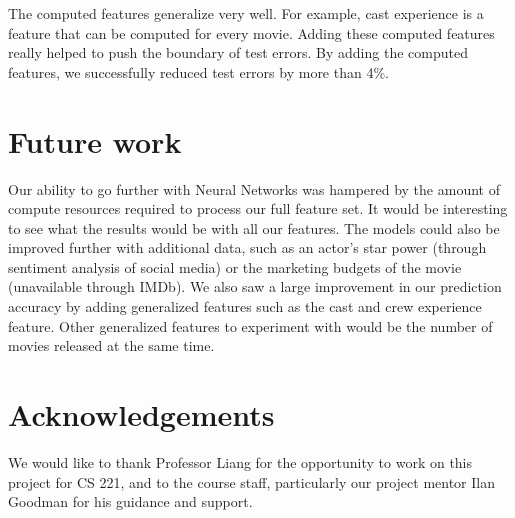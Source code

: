\documentclass[journal]{IEEEtran}
\begin{document}
\par The computed features generalize very well. For example, cast experience is a feature that can be computed for every movie. Adding these computed features really helped to push the boundary of test errors. By adding the computed features, we successfully reduced test errors by more than 4\%.

\section{Future work}
Our ability to go further with Neural Networks was hampered by the amount of
compute resources required to process our full feature set. It would be
interesting to see what the results would be with all our features. The models
could also be improved further with additional data, such as an actor's star
power (through sentiment analysis of social media) or the marketing budgets of
the movie (unavailable through IMDb). We also saw a large improvement in our
prediction accuracy by adding generalized features such as the cast and crew
experience feature. Other generalized features to experiment with would be the
number of movies released at the same time.

\section{Acknowledgements}
We would like to thank Professor Liang for the opportunity to work on this
project for CS 221, and to the course staff, particularly our project mentor
Ilan Goodman for his guidance and support.
\end{document}
